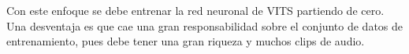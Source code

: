 Con este enfoque se debe entrenar la red neuronal de VITS partiendo de cero. Una desventaja es que cae una gran responsabilidad sobre el conjunto de datos de entrenamiento, pues debe tener una gran riqueza y muchos clips de audio.
	
	







